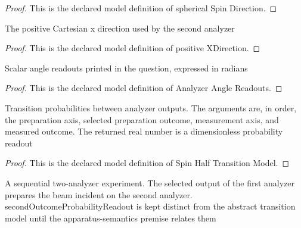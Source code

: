\begin{proof}
  This is the declared model definition of spherical Spin Direction.
\end{proof}
\begin{definition}
  \label{def:physics:phyx-mini-0541:phyxminiproblems-problemphyxmini0541-positivexdirection}
  The positive Cartesian x direction used by the second analyzer
\end{definition}
\begin{proof}
  This is the declared model definition of positive XDirection.
\end{proof}
\begin{definition}
  \label{def:physics:phyx-mini-0541:phyxminiproblems-problemphyxmini0541-analyzeranglereadouts}
  Scalar angle readouts printed in the question, expressed in radians
\end{definition}
\begin{proof}
  This is the declared model definition of Analyzer Angle Readouts.
\end{proof}
\begin{definition}
  \label{def:physics:phyx-mini-0541:phyxminiproblems-problemphyxmini0541-spinhalftransitionmodel}
  Transition probabilities between analyzer outputs. The arguments are, in order, the preparation axis, selected preparation outcome, measurement axis, and measured outcome. The returned real number is a dimensionless probability readout
\end{definition}
\begin{proof}
  This is the declared model definition of Spin Half Transition Model.
\end{proof}
\begin{definition}
  \label{def:physics:phyx-mini-0541:phyxminiproblems-problemphyxmini0541-sequentialsterngerlachexperiment}
  A sequential two-analyzer experiment. The selected output of the first analyzer prepares the beam incident on the second analyzer. secondOutcomeProbabilityReadout is kept distinct from the abstract transition model until the apparatus-semantics premise relates them
\end{definition}
